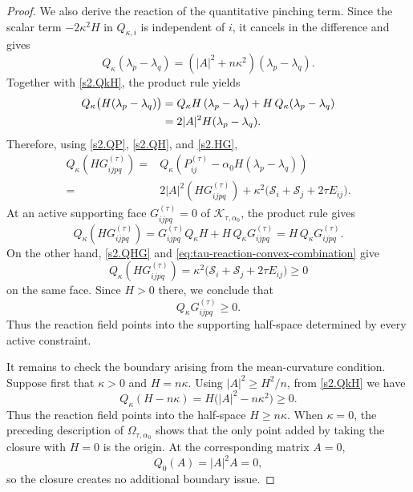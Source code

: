 \documentclass[11pt,reqno]{amsart}
\theoremstyle{definition}
\theoremstyle{remark}
\numberwithin{equation}{section}
\begin{document}
\begin{proof}
We also derive the reaction of the quantitative pinching term.  Since
the scalar term $-2\kappa^2H$ in $Q_{\kappa,i}$ is independent of $i$,
it cancels in the difference and gives
\begin{equation*}
 Q_\kappa(\lambda_p-\lambda_q)
 =(|A|^2+n\kappa^2)(\lambda_p-\lambda_q).
\end{equation*}
Together with \eqref{s2.QkH}, the product rule yields
\begin{align}
 Q_\kappa\bigl(H(\lambda_p-\lambda_q)\bigr)
 &=Q_\kappa H\,(\lambda_p-\lambda_q)
   +H\,Q_\kappa(\lambda_p-\lambda_q)\notag\\
 &=2|A|^2H(\lambda_p-\lambda_q).
 \label{s2.QH}
\end{align}
Therefore, using \eqref{s2.QP}, \eqref{s2.QH}, and \eqref{s2.HG},
\begin{align}\label{s2.QHG}
 Q_\kappa\left(H G_{ijpq}^{(\tau)}\right)=&Q_\kappa \left(P_{ij}^{(\tau)}-\alpha_0 H(\lambda_p-\lambda_q)\right)\nonumber\\
 =&2|A|^2\left(H G_{ijpq}^{(\tau)}\right)
   +\kappa^2\bigl(\mathcal S_i+\mathcal S_j+2\tau E_{ij}\bigr).
\end{align}
At an active supporting face $G_{ijpq}^{(\tau)}=0$ of
$\mathcal K_{\tau,\alpha_0}$, the product rule gives
\begin{equation*}
 Q_\kappa\left(H G_{ijpq}^{(\tau)}\right)
 =G_{ijpq}^{(\tau)}Q_\kappa H
   +H\,Q_\kappa G_{ijpq}^{(\tau)}
 =H\,Q_\kappa G_{ijpq}^{(\tau)}.
\end{equation*}
On the other hand, \eqref{s2.QHG} and
\eqref{eq:tau-reaction-convex-combination} give
\begin{equation*}
 Q_\kappa\left(H G_{ijpq}^{(\tau)}\right)
 =\kappa^2
   \bigl(\mathcal S_i+\mathcal S_j+2\tau E_{ij}\bigr)
 \geq0
\end{equation*}
on the same face.  Since $H>0$ there, we conclude that
\begin{equation*}
 Q_\kappa G_{ijpq}^{(\tau)}\geq0.
\end{equation*}
Thus the reaction field points into the supporting half-space determined by
every active constraint.

It remains to check the boundary arising from the mean-curvature
condition.  Suppose first that $\kappa>0$ and $H=n\kappa$.   
Using $|A|^2\geq H^2/n$, from \eqref{s2.QkH} we have
\begin{equation*}
 Q_\kappa(H-n\kappa)
 =H\bigl(|A|^2-n\kappa^2\bigr)
 \geq0.
\end{equation*}
Thus the reaction field points into the half-space $H\geq n\kappa$.
When $\kappa=0$, the preceding description of
$\Omega_{\tau,\alpha_0}$ shows that the only point added by taking the
closure with $H=0$ is the origin.  At the corresponding matrix $A=0$,
\begin{equation*}
 Q_0(A)=|A|^2A=0,
\end{equation*}
so the closure creates no additional boundary issue.


\end{proof}
\end{document}

